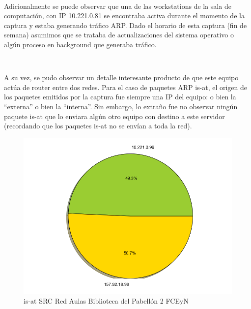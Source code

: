 ~

Adicionalmente se puede observar que una de las workstations de la sala de computación, con IP 10.221.0.81 se encontraba activa durante el momento de la captura y estaba generando tráfico ARP. 
Dado el horario de esta captura (fin de semana) asumimos que se trataba de actualizaciones del sistema operativo o algún proceso en background que generaba tráfico.

~

A su vez, se pudo observar un detalle interesante producto de que este equipo actúa de router entre dos redes.
Para el caso de paquetes ARP is-at, el origen de los paquetes emitidos por la captura fue siempre una IP del equipo: o bien la ``externa'' o bien la ``interna''. Sin embargo, lo extraño fue no observar ningún paquete is-at que lo enviara algún otro equipo con destino a este servidor (recordando que los paquetes is-at no se envían a toda la red).


\begin{center}
	\begin{figure}[ht]
    	\centering
		\includegraphics[width=12cm]{imgs/outputPabloRedAulasPab2_p-arp_is_src-torta.png}
		\caption{is-at SRC Red Aulas Biblioteca del Pabellón 2 FCEyN}
	\end{figure}
\end{center}





